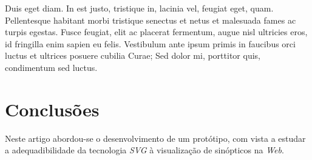 \documentclass[twocolumn,twoside,10pt,a4paper]{article}
\newcommand{\class}[1]{{\normalfont\slshape #1\/}}
\newcommand{\svg}{\class{SVG}}
\begin{document}


Duis eget diam. In est justo, tristique in, lacinia vel, feugiat eget,
quam. Pellentesque habitant morbi tristique senectus et netus et
malesuada fames ac turpis egestas. Fusce feugiat, elit ac placerat
fermentum, augue nisl ultricies eros, id fringilla enim sapien eu
felis. Vestibulum ante ipsum primis in faucibus orci luctus et
ultrices posuere cubilia Curae; Sed dolor mi, porttitor quis,
condimentum sed luctus. 

\section{Conclusões}\label{sec:conclusions}

Neste artigo abordou-se o desenvolvimento de um protótipo, com vista a
estudar a adequadibilidade da tecnologia \svg{} à visualização de
sinópticos na \textit{Web}.
\end{document}
